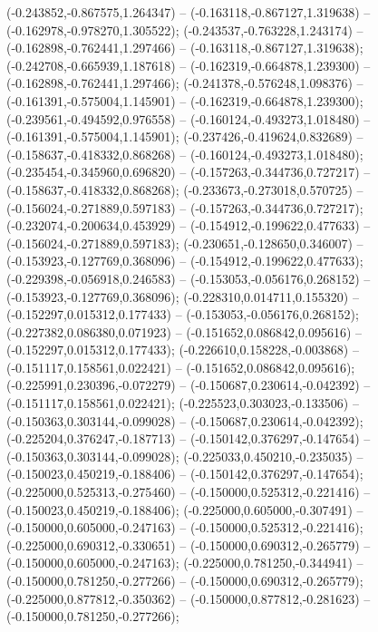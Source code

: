  (-0.243852,-0.867575,1.264347) -- (-0.163118,-0.867127,1.319638) -- (-0.162978,-0.978270,1.305522);
 (-0.243537,-0.763228,1.243174) -- (-0.162898,-0.762441,1.297466) -- (-0.163118,-0.867127,1.319638);
 (-0.242708,-0.665939,1.187618) -- (-0.162319,-0.664878,1.239300) -- (-0.162898,-0.762441,1.297466);
 (-0.241378,-0.576248,1.098376) -- (-0.161391,-0.575004,1.145901) -- (-0.162319,-0.664878,1.239300);
 (-0.239561,-0.494592,0.976558) -- (-0.160124,-0.493273,1.018480) -- (-0.161391,-0.575004,1.145901);
 (-0.237426,-0.419624,0.832689) -- (-0.158637,-0.418332,0.868268) -- (-0.160124,-0.493273,1.018480);
 (-0.235454,-0.345960,0.696820) -- (-0.157263,-0.344736,0.727217) -- (-0.158637,-0.418332,0.868268);
 (-0.233673,-0.273018,0.570725) -- (-0.156024,-0.271889,0.597183) -- (-0.157263,-0.344736,0.727217);
 (-0.232074,-0.200634,0.453929) -- (-0.154912,-0.199622,0.477633) -- (-0.156024,-0.271889,0.597183);
 (-0.230651,-0.128650,0.346007) -- (-0.153923,-0.127769,0.368096) -- (-0.154912,-0.199622,0.477633);
 (-0.229398,-0.056918,0.246583) -- (-0.153053,-0.056176,0.268152) -- (-0.153923,-0.127769,0.368096);
 (-0.228310,0.014711,0.155320) -- (-0.152297,0.015312,0.177433) -- (-0.153053,-0.056176,0.268152);
 (-0.227382,0.086380,0.071923) -- (-0.151652,0.086842,0.095616) -- (-0.152297,0.015312,0.177433);
 (-0.226610,0.158228,-0.003868) -- (-0.151117,0.158561,0.022421) -- (-0.151652,0.086842,0.095616);
 (-0.225991,0.230396,-0.072279) -- (-0.150687,0.230614,-0.042392) -- (-0.151117,0.158561,0.022421);
 (-0.225523,0.303023,-0.133506) -- (-0.150363,0.303144,-0.099028) -- (-0.150687,0.230614,-0.042392);
 (-0.225204,0.376247,-0.187713) -- (-0.150142,0.376297,-0.147654) -- (-0.150363,0.303144,-0.099028);
 (-0.225033,0.450210,-0.235035) -- (-0.150023,0.450219,-0.188406) -- (-0.150142,0.376297,-0.147654);
 (-0.225000,0.525313,-0.275460) -- (-0.150000,0.525312,-0.221416) -- (-0.150023,0.450219,-0.188406);
 (-0.225000,0.605000,-0.307491) -- (-0.150000,0.605000,-0.247163) -- (-0.150000,0.525312,-0.221416);
 (-0.225000,0.690312,-0.330651) -- (-0.150000,0.690312,-0.265779) -- (-0.150000,0.605000,-0.247163);
 (-0.225000,0.781250,-0.344941) -- (-0.150000,0.781250,-0.277266) -- (-0.150000,0.690312,-0.265779);
 (-0.225000,0.877812,-0.350362) -- (-0.150000,0.877812,-0.281623) -- (-0.150000,0.781250,-0.277266);
